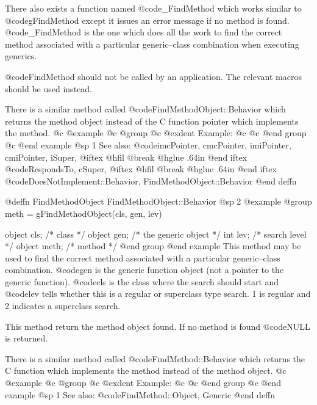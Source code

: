 There also exists a function named @code{_FindMethod} which works
similar to @code{gFindMethod} except it issues an error message if no
method is found.  @code{_FindMethod} is the one which does all the work
to find the correct method associated with a particular generic--class
combination when executing generics.

@code{FindMethod} should not be called by an application.  The relevant
macros should be used instead.

There is a similar method called @code{FindMethodObject::Behavior} which
returns the method object instead of the C function pointer which
implements the method.
@c @example
@c @group
@c @exdent Example:
@c 
@c @end group
@c @end example
@sp 1
See also:  @code{imcPointer, cmcPointer, imiPointer, cmiPointer, iSuper,}
@iftex
@hfil @break @hglue .64in    
@end iftex
@code{RespondsTo, cSuper,}
@iftex
@hfil @break @hglue .64in    
@end iftex
@code{DoesNotImplement::Behavior, FindMethodObject::Behavior}
@end deffn















@deffn {FindMethodObject} FindMethodObject::Behavior
@sp 2
@example
@group
meth = gFindMethodObject(cls, gen, lev)

object  cls;    /* class                */
object  gen;    /* the generic object   */
int     lev;    /* search level         */
object  meth;   /*  method          */
@end group
@end example
This method may be used to find the correct
method associated with a particular generic--class combination.
@code{gen} is the generic function object (not a pointer to the generic
function).  @code{cls} is the class where the search should start and
@code{lev} tells whether this is a regular or superclass type search.
1 is regular and 2 indicates a superclass search.

This method return the method object found.  If no method is found
@code{NULL} is returned.

There is a similar method called @code{FindMethod::Behavior} which
returns the C function which implements the method instead of the method
object.
@c @example
@c @group
@c @exdent Example:
@c 
@c @end group
@c @end example
@sp 1
See also:  @code{FindMethod::Object, Generic}
@end deffn














